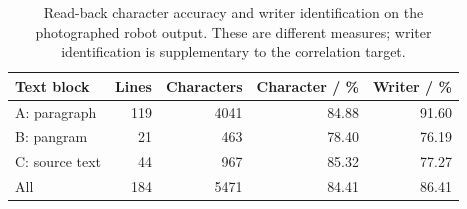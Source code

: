 \begin{table}[!htbp]\centering\small
\begin{tabular}{lrrrr}\toprule
\textbf{Text block} & \textbf{Lines} & \textbf{Characters} & \textbf{Character / \%} & \textbf{Writer / \%}\\\midrule
A: paragraph & 119 & 4041 & 84.88 & 91.60\\
B: pangram & 21 & 463 & 78.40 & 76.19\\
C: source text & 44 & 967 & 85.32 & 77.27\\
All & 184 & 5471 & 84.41 & 86.41\\
\bottomrule\end{tabular}
\caption{Read-back character accuracy and writer identification on the photographed robot output. These are different measures; writer identification is supplementary to the correlation target.}\label{tab:res-r1-blocks}
\end{table}
